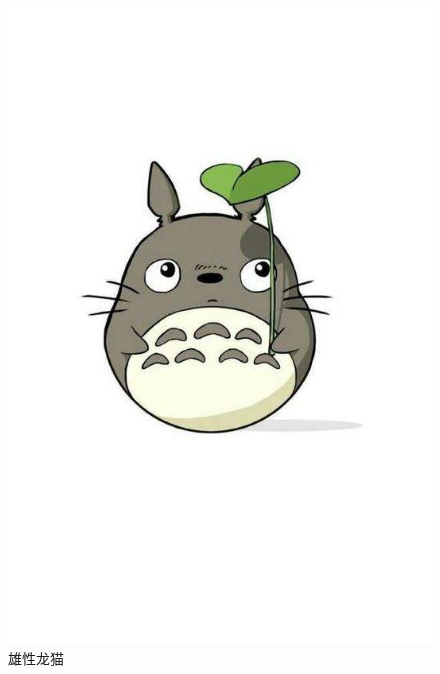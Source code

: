 \documentclass[12pt]{ctexart}
\begin{document}
\begin{spacing}{1.5}
\begin{figure}[h]
\begin{minipage}[t]{0.3\linewidth}
		\includegraphics[width=1\textwidth]{figures/4.jpg}
		\caption*{雄性龙猫}
	\end{minipage}
	\hfill
	\begin{minipage}[t]{0.3\linewidth}

\end{minipage}
\end{figure}
\end{spacing}
\end{document}
